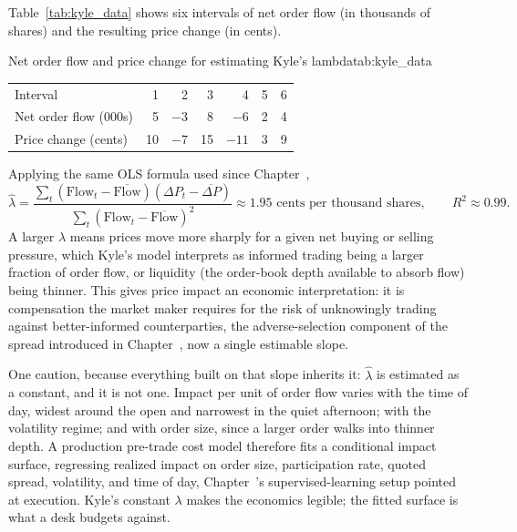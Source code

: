 \documentclass[../ai_in_finance]{subfiles}
\begin{document}
Table~\ref{tab:kyle_data} shows six intervals of net order flow (in thousands of shares) and the resulting price change (in cents).

\begin{booktable}[htbp]{Net order flow and price change for estimating Kyle's lambda}{tab:kyle_data}
\begin{tabular}{lrrrrrr}
\toprule
Interval & 1 & 2 & 3 & 4 & 5 & 6 \\
Net order flow (000s) & 5 & $-3$ & 8 & $-6$ & 2 & 4 \\
Price change (cents) & 10 & $-7$ & 15 & $-11$ & 3 & 9 \\
\bottomrule
\end{tabular}
\end{booktable}

Applying the same OLS formula used since Chapter~,
\begin{equation*}
\hat\lambda = \frac{\sum_t (\text{Flow}_t - \overline{\text{Flow}})(\Delta P_t - \overline{\Delta P})}{\sum_t (\text{Flow}_t-\overline{\text{Flow}})^2} \approx 1.95 \text{ cents per thousand shares}, \qquad R^2 \approx 0.99.
\end{equation*}
A larger $\lambda$ means prices move more sharply for a given net buying or selling pressure, which Kyle's model interprets as informed trading being a larger fraction of order flow, or liquidity (the order-book depth available to absorb flow) being thinner. This gives price impact an economic interpretation: it is compensation the market maker requires for the risk of unknowingly trading against better-informed counterparties, the adverse-selection component of the spread introduced in Chapter~, now a single estimable slope.

One caution, because everything built on that slope inherits it: $\hat\lambda$ is estimated as a constant, and it is not one. Impact per unit of order flow varies with the time of day, widest around the open and narrowest in the quiet afternoon; with the volatility regime; and with order size, since a larger order walks into thinner depth. A production pre-trade cost model therefore fits a conditional impact surface, regressing realized impact on order size, participation rate, quoted spread, volatility, and time of day, Chapter~'s supervised-learning setup pointed at execution. Kyle's constant $\lambda$ makes the economics legible; the fitted surface is what a desk budgets against.
\end{document}
